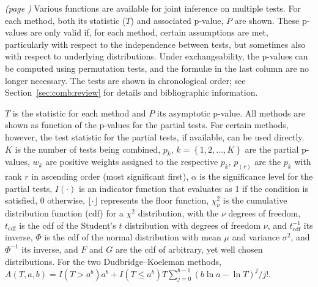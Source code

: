\begin{table}[!b]
\caption[Summary of various combining functions]{\emph{(page \pageref{tab:comb:comparison_noref})} Various functions are available for joint inference on multiple tests. For each method, both its statistic ($T$) and associated p-value, $P$ are shown. These p-values are only valid if, for each method, certain assumptions are met, particularly with respect to the independence between tests, but sometimes also with respect to underlying distributions. Under exchangeability, the p-values can be computed using permutation tests, and the formul\ae{} in the last column are no longer necessary. The tests are shown in chronological order; see Section~\ref{sec:comb:review} for details and bibliographic information.} 
{\footnotesize
$T$ is the statistic for each method and $P$ its asymptotic p-value. All methods are shown as function of the p-values for the partial tests. For certain methods, however, the test statistic for the partial tests, if available, can be used directly.
$K$ is the number of tests being combined,
$p_{k}$, $k=\left\{1,2,\ldots,K\right\}$ are the partial p-values,
$w_{k}$ are positive weights assigned to the respective $p_{k}$,
$p_{(r)}$ are the $p_{k}$ with rank $r$ in ascending order (most significant first),
$\alpha$ is the significance level for the partial tests,
$I(\cdot)$ is an indicator function that evaluates as 1 if the condition is satisfied, 0 otherwise,
$\lfloor \cdot \rfloor$ represents the floor function,
$\chi^{2}_{\nu}$ is the cumulative distribution function (cdf) for a $\chi^{2}$ distribution, with the $\nu$ degrees of freedom,
$t_{\text{cdf}}$ is the cdf of the Student's $t$ distribution with degrees of freedom $\nu$, and $t_{\text{cdf}}^{-1}$ its inverse,
$\Phi$ is the cdf of the normal distribution with mean $\mu$ and variance $\sigma^{2}$, and $\Phi^{-1}$ its inverse, and
$F$ and $G$ are the cdf of arbitrary, yet well chosen distributions.
For the two Dudbridge--Koeleman methods, $A\left(T,a,b\right)=I\left(T>a^{b}\right) a^{b} +I\left(T \leqslant a^{b}\right) T \sum_{j=0}^{b-1}{\left(b\ln a - \ln T\right)^{j}}/{j!}$.\par}
\label{tab:comb:comparison}
\end{table}
\addtolength{\belowcaptionskip}{-0pt}

